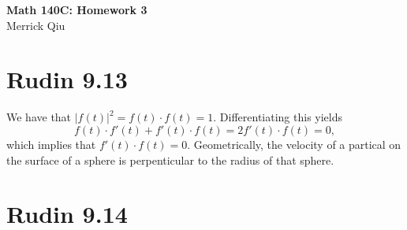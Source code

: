 \documentclass{article}
\begin{document}
\begin{center}
	\huge{\bf Math 140C: Homework 3} \\
	Merrick Qiu
\end{center}

\section*{Rudin 9.13}
We have that $|f(t)|^2 = f(t)\cdot f(t)= 1$.
Differentiating this yields 
\[
  f(t)\cdot f'(t) + f'(t)\cdot f(t) = 2f'(t)\cdot f(t) = 0,
\]
which implies that $f'(t)\cdot f(t) = 0$.
Geometrically, the velocity of a partical on the surface of a sphere
is perpenticular to the radius of that sphere.
\newpage 

\section*{Rudin 9.14}
\end{document}
